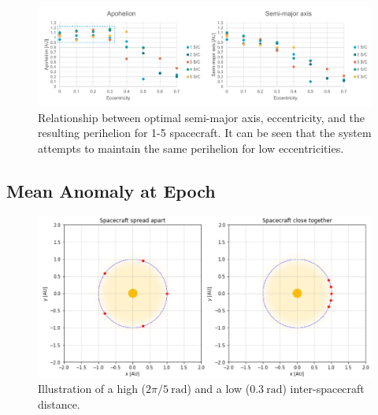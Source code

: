 \begin{figure}[htbp]
 \centering
 \includegraphics[width=1.0\textwidth]{img/eccentricity_optimal.pdf}
 \caption{Relationship between optimal semi-major axis, eccentricity, and the resulting perihelion for 1-5 spacecraft. It can be seen that the system attempts to maintain the same perihelion for low eccentricities.}
 \label{fig:eccentricity_optimal}
\end{figure}


\subsection{Mean Anomaly at Epoch}
\begin{figure}
 \centering
 \includegraphics[width=1.0\textwidth]{img/spread_illustration.png}
 \caption{Illustration of a high ($2\pi/5~\mathrm{rad}$) and a low ($0.3~\mathrm{rad}$) inter-spacecraft distance.}
 \label{fig:spread_illustration}
\end{figure}

